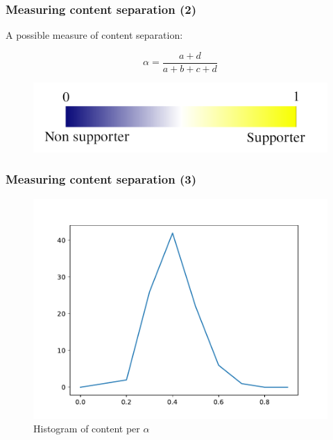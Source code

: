 \documentclass{beamer}
\begin{document}
\begin{frame}[c]
    \frametitle{Measuring content separation (2)}

    A possible measure of content separation:

    \begin{equation}
        \alpha = \frac{a + d}{a + b + c + d} 
    \end{equation}

    \begin{figure}[htpb]
        \centering
        \includegraphics[width=0.8\linewidth]{img/gradient-caption.png}
    \end{figure}

\end{frame}

\begin{frame}[c]
    \frametitle{Measuring content separation (3)}

    \begin{figure}[htpb]
        \centering
        \includegraphics[width=0.8\linewidth]{out/experimental200/experimental200-support-hist.pdf}
        \caption{Histogram of content per $\alpha $}%
        \label{fig:out/experimental200/experimental200-support-hist}
    \end{figure}
\end{frame}
\end{document}
